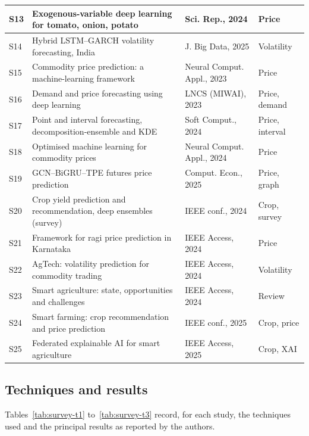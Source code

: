{\begin{longtable}{|p{0.9cm}|p{7.7cm}|p{4.2cm}|p{2.7cm}|}
S13 & Exogenous-variable deep learning for tomato, onion, potato~\cite{exogenous2024} & Sci. Rep., 2024 & Price \\ \hline
S14 & Hybrid LSTM--GARCH volatility forecasting, India~\cite{manogna2025} & J. Big Data, 2025 & Volatility \\ \hline
S15 & Commodity price prediction: a machine-learning framework~\cite{mohanty2023} & Neural Comput. Appl., 2023 & Price \\ \hline
S16 & Demand and price forecasting using deep learning~\cite{demand2023} & LNCS (MIWAI), 2023 & Price, demand \\ \hline
S17 & Point and interval forecasting, decomposition-ensemble and KDE~\cite{kde2024} & Soft Comput., 2024 & Price, interval \\ \hline
S18 & Optimised machine learning for commodity prices~\cite{optimized2023} & Neural Comput. Appl., 2024 & Price \\ \hline
S19 & GCN--BiGRU--TPE futures price prediction~\cite{gcn2024} & Comput. Econ., 2025 & Price, graph \\ \hline
S20 & Crop yield prediction and recommendation, deep ensembles (survey)~\cite{cropyield} & IEEE conf., 2024 & Crop, survey \\ \hline
S21 & Framework for ragi price prediction in Karnataka~\cite{meena2024} & IEEE Access, 2024 & Price \\ \hline
S22 & AgTech: volatility prediction for commodity trading~\cite{agtech2024} & IEEE Access, 2024 & Volatility \\ \hline
S23 & Smart agriculture: state, opportunities and challenges~\cite{smartag2024} & IEEE Access, 2024 & Review \\ \hline
S24 & Smart farming: crop recommendation and price prediction~\cite{smartfarm2025} & IEEE conf., 2025 & Crop, price \\ \hline
S25 & Federated explainable AI for smart agriculture~\cite{fedxai2025} & IEEE Access, 2025 & Crop, XAI \\ \hline
\end{longtable}}

\subsection{Techniques and results}
Tables~\ref{tab:survey-t1} to~\ref{tab:survey-t3} record, for each study, the techniques used and the principal results as reported by the authors.

